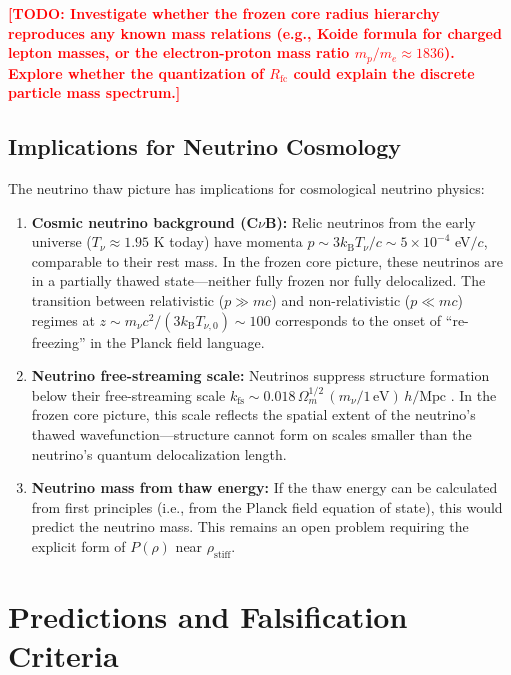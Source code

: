 \documentclass[11pt,a4paper]{article}
\newcommand{\kB}{\ensuremath{k_{\mathrm{B}}}}
\newcommand{\rhostiff}{\ensuremath{\rho_{\mathrm{stiff}}}}
\newcommand{\Rfc}{\ensuremath{R_{\mathrm{fc}}}}
\newcommand{\TODO}[1]{\textcolor{red}{\textbf{[TODO: #1]}}}
\theoremstyle{definition}
\theoremstyle{remark}
\begin{document}
\TODO{Investigate whether the frozen core radius hierarchy reproduces any known mass relations (e.g., Koide formula for charged lepton masses, or the electron-proton mass ratio $m_p/m_e \approx 1836$). Explore whether the quantization of $\Rfc$ could explain the discrete particle mass spectrum.}

\subsection{Implications for Neutrino Cosmology}
\label{sec:neutrino_cosmology}

The neutrino thaw picture has implications for cosmological neutrino physics:

\begin{enumerate}[leftmargin=*, itemsep=0.3em]
\item \textbf{Cosmic neutrino background (C$\nu$B):} Relic neutrinos from the early universe ($T_\nu \approx 1.95$ K today) have momenta $p \sim 3\kB T_\nu/c \sim 5 \times 10^{-4}$ eV$/c$, comparable to their rest mass. In the frozen core picture, these neutrinos are in a partially thawed state---neither fully frozen nor fully delocalized. The transition between relativistic ($p \gg mc$) and non-relativistic ($p \ll mc$) regimes at $z \sim m_\nu c^2/(3\kB T_{\nu,0}) \sim 100$ corresponds to the onset of ``re-freezing'' in the Planck field language.

\item \textbf{Neutrino free-streaming scale:} Neutrinos suppress structure formation below their free-streaming scale $k_{\mathrm{fs}} \sim 0.018\,\Omega_m^{1/2}\,(m_\nu/1\,\text{eV})\,h/\text{Mpc}$ \cite{Lesgourgues2006}. In the frozen core picture, this scale reflects the spatial extent of the neutrino's thawed wavefunction---structure cannot form on scales smaller than the neutrino's quantum delocalization length.

\item \textbf{Neutrino mass from thaw energy:} If the thaw energy can be calculated from first principles (i.e., from the Planck field equation of state), this would predict the neutrino mass. This remains an open problem requiring the explicit form of $P(\rho)$ near $\rhostiff$.
\end{enumerate}

\section{Predictions and Falsification Criteria}
\label{sec:predictions}
\end{document}
